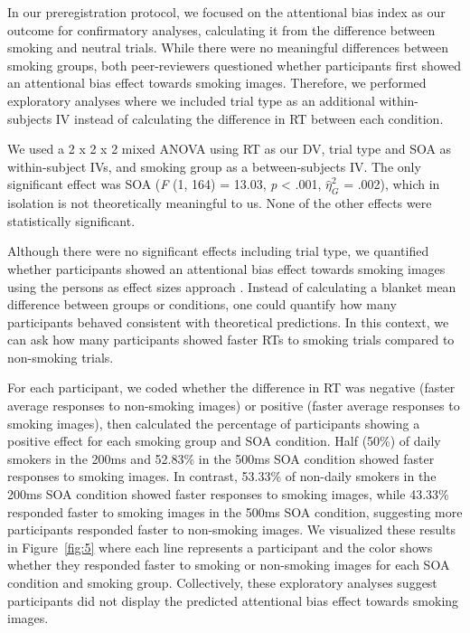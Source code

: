 \documentclass[empirical, authordate]{jote-new-article}
\begin{document}
In our preregistration protocol, we focused on the attentional bias index as our outcome for confirmatory analyses, calculating it from the difference between smoking and neutral trials. While there were no meaningful differences between smoking groups, both peer-reviewers questioned whether participants first showed an attentional bias effect towards smoking images. Therefore, we performed exploratory analyses where we included trial type as an additional within-subjects IV instead of calculating the difference in RT between each condition.

We used a 2 x 2 x 2 mixed ANOVA using RT as our DV, trial type and SOA as within-subject IVs, and smoking group as a between-subjects IV. The only significant effect was SOA (\emph{F} (1, 164) = 13.03, \emph{p} < .001, $\hat{\eta}_{G}^{2}$ = .002), which in isolation is not theoretically meaningful to us. None of the other effects were statistically significant.

Although there were no significant effects including trial type, we quantified whether participants showed an attentional bias effect towards smoking images using the persons as effect sizes approach \parencite{Grice2020}. Instead of calculating a blanket mean difference between groups or conditions, one could quantify how many participants behaved consistent with theoretical predictions. In this context, we can ask how many participants showed faster RTs to smoking trials compared to non-smoking trials.

For each participant, we coded whether the difference in RT was negative (faster average responses to non-smoking images) or positive (faster average responses to smoking images), then calculated the percentage of participants showing a positive effect for each smoking group and SOA condition. Half (50\%) of daily smokers in the 200ms and 52.83\% in the 500ms SOA condition showed faster responses to smoking images. In contrast, 53.33\% of non-daily smokers in the 200ms SOA condition showed faster responses to smoking images, while 43.33\% responded faster to smoking images in the 500ms SOA condition, suggesting more participants responded faster to non-smoking images. We visualized these results in Figure~\ref{fig:5} where each line represents a participant and the color shows whether they responded faster to smoking or non-smoking images for each SOA condition and smoking group. Collectively, these exploratory analyses suggest participants did not display the predicted attentional bias effect towards smoking images.
\end{document}

